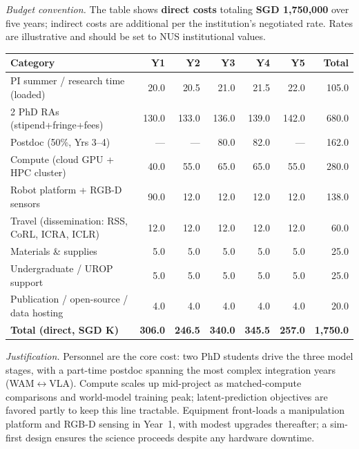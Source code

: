 \documentclass[11pt]{article}
\begin{document}
\emph{Budget convention.} The table shows \textbf{direct costs} totaling \textbf{SGD 1,750,000} over five years; indirect costs are additional per the institution's negotiated rate. Rates are illustrative and should be set to NUS institutional values.

\medskip
\renewcommand{\arraystretch}{1.15}
\noindent\begin{tabularx}{\textwidth}{@{}X r r r r r r@{}}
\textbf{Category} & \textbf{Y1} & \textbf{Y2} & \textbf{Y3} & \textbf{Y4} & \textbf{Y5} & \textbf{Total} \\
\hline
PI summer / research time (loaded) & 20.0 & 20.5 & 21.0 & 21.5 & 22.0 & 105.0 \\
2 PhD RAs (stipend+fringe+fees) & 130.0 & 133.0 & 136.0 & 139.0 & 142.0 & 680.0 \\
Postdoc (50\%, Yrs 3--4) & --- & --- & 80.0 & 82.0 & --- & 162.0 \\
Compute (cloud GPU + HPC cluster) & 40.0 & 55.0 & 65.0 & 65.0 & 55.0 & 280.0 \\
Robot platform + RGB-D sensors & 90.0 & 12.0 & 12.0 & 12.0 & 12.0 & 138.0 \\
Travel (dissemination: RSS, CoRL, ICRA, ICLR) & 12.0 & 12.0 & 12.0 & 12.0 & 12.0 & 60.0 \\
Materials \& supplies & 5.0 & 5.0 & 5.0 & 5.0 & 5.0 & 25.0 \\
Undergraduate / UROP support & 5.0 & 5.0 & 5.0 & 5.0 & 5.0 & 25.0 \\
Publication / open-source / data hosting & 4.0 & 4.0 & 4.0 & 4.0 & 4.0 & 20.0 \\
\hline
\textbf{Total (direct, SGD K)} & \textbf{306.0} & \textbf{246.5} & \textbf{340.0} & \textbf{345.5} & \textbf{257.0} & \textbf{1{,}750.0} \\
\hline
\end{tabularx}

\medskip
\emph{Justification.} Personnel are the core cost: two PhD students drive the three model stages, with a part-time postdoc spanning the most complex integration years (WAM$\leftrightarrow$VLA). Compute scales up mid-project as matched-compute comparisons and world-model training peak; latent-prediction objectives are favored partly to keep this line tractable. Equipment front-loads a manipulation platform and RGB-D sensing in Year~1, with modest upgrades thereafter; a sim-first design ensures the science proceeds despite any hardware downtime.



\end{document}
